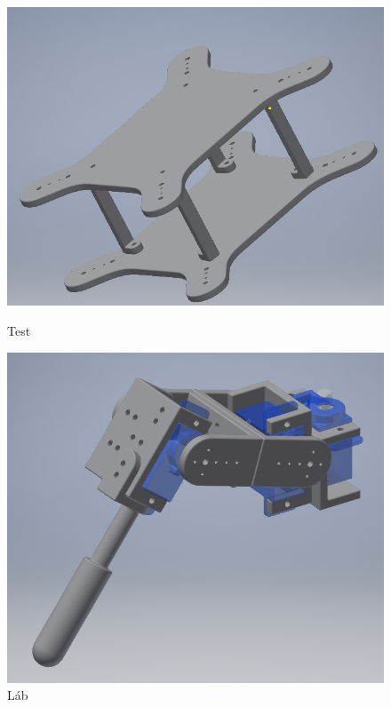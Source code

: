 \documentclass{article}
\begin{document}
\begin{figure}[h]
	\centering
	\begin{minipage}{0.45\textwidth}
		\centering
		\includegraphics[width=\textwidth]{fulltest}
		\caption{Test}
	\end{minipage}\hfill
	\begin{minipage}{0.45\textwidth}
		\centering
		\includegraphics[width=\textwidth]{fulllab}
		\caption{Láb}
	\end{minipage}
\end{figure}
\end{document}
